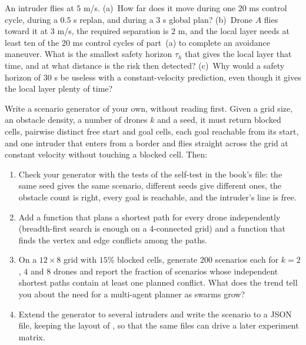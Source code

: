 \begin{exercise}[\difficulty{1}]
\label{exr:ch01-timescales}
An intruder flies at $5$ m/s. (a)~How far does it move during one $20$ ms control
cycle, during a $0.5$ s replan, and during a $3$ s global plan? (b)~Drone $A$ flies
toward it at $3$ m/s, the required separation is $2$ m, and the local layer needs at
least ten of the $20$ ms control cycles of part~(a) to complete an avoidance
maneuver. What is the smallest
safety horizon $\tau_h$ that gives the local layer that time, and at
what distance is the risk then detected? (c)~Why would a safety horizon of $30$ s be
useless with a constant-velocity prediction, even though it gives the local layer
plenty of time?
\end{exercise}

\begin{exercise}
\label{exr:ch01-coding}
Write a scenario generator of your own, without reading 
first. Given a grid size, an obstacle density, a number of drones $k$ and a seed, it
must return blocked cells, pairwise distinct free start and goal cells, each goal
reachable from its start, and one intruder that enters from a border and flies
straight across the grid at constant velocity without touching a blocked cell. Then:
\begin{enumerate}[label=(\alph*)]
  \item Check your generator with the tests of the self-test in the book's file: the
        same seed gives the same scenario, different seeds give different ones, the
        obstacle count is right, every goal is reachable, and the intruder's line is
        free.
  \item Add a function that plans a shortest path for every drone independently
        (breadth-first search is enough on a 4-connected grid) and a function that
        finds the vertex and edge conflicts among the paths.
  \item On a $12\times 8$ grid with $15\%$ blocked cells, generate $200$ scenarios
        each for $k=2$, $4$ and $8$ drones and report the fraction of scenarios whose
        independent shortest paths contain at least one planned conflict. What does the
        trend tell you about the need for a multi-agent planner as swarms grow?
  \item Extend the generator to several intruders and write the scenario to a JSON
        file, keeping the layout of , so that the same files can drive a
        later experiment matrix.
\end{enumerate}
\end{exercise}
